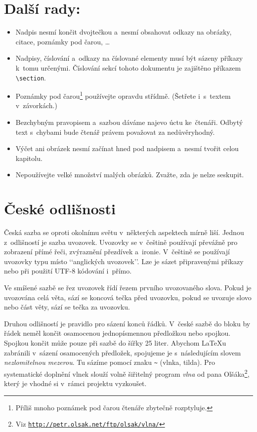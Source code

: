 \documentclass[twocolumn, 10pt, a4paper]{article}
\begin{document}
\section{Další rady:}

\begin{itemize}
    \item Nadpis nesmí končit dvojtečkou a~nesmí obsahovat odkazy na obrázky, citace, poznámky pod čarou, \dots
    \item Nadpisy, číslování a~odkazy na číslované elementy musí být sázeny příkazy k~tomu určenými. Číslování sekcí tohoto dokumentu je zajištěno příkazem \verb|\section|.
    \item Poznámky pod čarou\footnote{Příliš mnoho poznámek pod čarou čtenáře zbytečně rozptyluje.} používejte opravdu střídmě. (Šetřete i~s~textem v~závorkách.)
    \item Bezchybným pravopisem a~sazbou dáváme najevo úctu ke~čtenáři. Odbytý text s~chybami bude čtenář právem považovat za nedůvěryhodný.
    \item Výčet ani obrázek nesmí začínat hned pod nadpisem a~nesmí tvořit celou kapitolu.
    \item Nepoužívejte velké množství malých obrázků. Zvažte, zda je nelze seskupit.
\end{itemize}


\section{České odlišnosti}

Česká sazba se oproti okolnímu světu v~některých aspektech mírně liší.
Jednou z~odlišností je sazba uvozovek.
Uvozovky se v~češtině používají převážně pro zobrazení přímé řeči, zvýraznění přezdívek a~ironie.
V~češtině se používají uvozovky typu  místo ‘‘anglických uvozovek’’.
Lze je sázet připravenými příkazy nebo při použití UTF-8 kódování i~přímo.

Ve smíšené sazbě se řez uvozovek řídí řezem prvního uvozovaného slova.
Pokud je uvozována celá věta, sází se koncová tečka před uvozovku, pokud se uvozuje slovo nebo část věty, sází se tečka za uvozovku.

Druhou odlišností je pravidlo pro sázení konců řádků.
V~české sazbě do bloku by řádek neměl končit osamocenou jednopísmennou předložkou nebo spojkou.
Spojkou  končit může pouze při sazbě do šířky 25 liter.
Abychom \LaTeX u zabránili v~sázení osamocených předložek, spojujeme je s~následujícím slovem \emph{nezlomitelnou mezerou}.
Tu sázíme pomocí znaku \verb|~| (vlnka, tilda).
Pro systematické doplnění vlnek slouží volně šiřitelný program \emph{vlna} od pana Olšáka\footnote{Viz \texttt{\href{http://petr.olsak.net/ftp/olsak/vlna/}{http://petr.olsak.net/ftp/olsak/vlna/}}}, který je vhodné si v~rámci projektu vyzkoušet.
\end{document}
